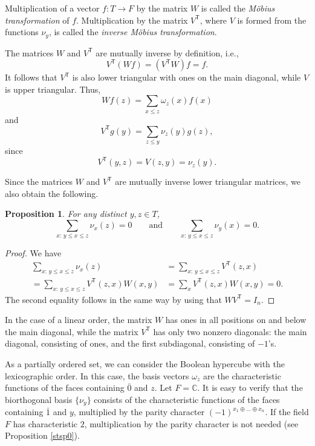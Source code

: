 \documentclass[11pt]{article}
\newtheorem{claim}{Proposition}[section]
\theoremstyle{definition}
\begin{document}
{{{%
Multiplication of a vector $f:T\rightarrow F$ by the matrix $W$
is called the {\sl Möbius transformation} of $f$. Multiplication
by the matrix $V^{\mathsf T}$, where $V$ is formed from the
functions $\nu_y$, is called the {\sl inverse Möbius transformation}.

The matrices $W$ and $V^{\mathsf T}$ are mutually inverse by definition, i.e.,
\[
V^{\mathsf T}(Wf)=(V^{\mathsf T}W)f=f.
\]
It follows that $V^{\mathsf T}$ is also lower triangular with ones
on the main diagonal, while $V$ is upper triangular. Thus,
\[
Wf(z)=\sum_{x\leq z}\omega_z(x)f(x)
\]
and
\[
V^{\mathsf T}g(y)=\sum_{z\leq y}\nu_z(y)g(z),
\]
since
\[
V^{\mathsf T}(y,z)=V(z,y)=\nu_z(y).
\]

Since the matrices $W$ and $V^{\mathsf T}$ are mutually inverse
lower triangular matrices, we also obtain the following.

\begin{claim}
For any distinct $y,z\in T$,
\[
\sum_{x:\,y\leq x\leq z}\nu_x(z)=0
\qquad\text{and}\qquad
\sum_{x:\,y\leq x\leq z}\nu_y(x)=0.
\]
\end{claim}

\begin{proof}
We have
\[
\begin{aligned}
\sum_{x:\,y\leq x\leq z}\nu_x(z)
&=\sum_{x:\,y\leq x\leq z}V^{\mathsf T}(z,x)\\
=\sum_{x:\,y\leq x\leq z}V^{\mathsf T}(z,x)W(x,y)&
=\sum_xV^{\mathsf T}(z,x)W(x,y)=0.
\end{aligned}
\]
The second equality follows in the same way by using that $WV^{\mathsf T}=I_n$.
\end{proof}

In the case of a linear order, the matrix $W$ has ones in all
positions on and below the main diagonal, while the matrix
$V^{\mathsf T}$ has only two nonzero diagonals: the main diagonal,
consisting of ones, and the first subdiagonal, consisting of $-1$'s.

As a partially ordered set, we can consider the Boolean hypercube
with the lexicographic order. In this case, the basis vectors
$\omega_z$ are the characteristic functions of the faces containing
$\bar 0$ and $z$. Let $F=\mathbb{C}$. It is easy to verify that the biorthogonal basis
$\{\nu_y\}$ consists of the characteristic functions of the faces
containing $\bar 1$ and $y$, multiplied by the parity character $(-1)^{x_1\oplus\dots\oplus x_n}$.
If the field $F$ has characteristic $2$, multiplication by the
parity character is not needed (see Proposition \ref{stsp0}).

}}}
\end{document}
